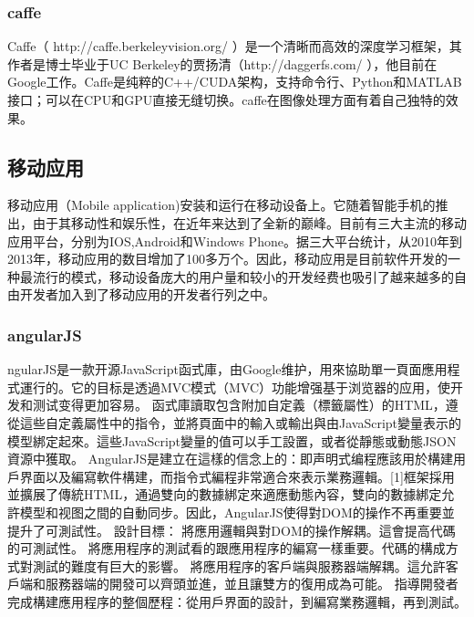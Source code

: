 \subsubsection{caffe}
Caffe（ http://caffe.berkeleyvision.org/ ）是一个清晰而高效的深度学习框架，其作者是博士毕业于UC Berkeley的贾扬清（http://daggerfs.com/ ），他目前在Google工作。Caffe是纯粹的C++/CUDA架构，支持命令行、Python和MATLAB接口；可以在CPU和GPU直接无缝切换。caffe在图像处理方面有着自己独特的效果。

\subsection{移动应用}
移动应用（Mobile application)安装和运行在移动设备上。它随着智能手机的推出，由于其移动性和娱乐性，在近年来达到了全新的巅峰。目前有三大主流的移动应用平台，分别为IOS,Android和Windows Phone。据三大平台统计，从2010年到2013年，移动应用的数目增加了100多万个。因此，移动应用是目前软件开发的一种最流行的模式，移动设备庞大的用户量和较小的开发经费也吸引了越来越多的自由开发者加入到了移动应用的开发者行列之中。
\subsubsection{angularJS}
ngularJS是一款开源JavaScript函式庫，由Google维护，用來協助單一頁面應用程式運行的。它的目标是透過MVC模式（MVC）功能增强基于浏览器的应用，使开发和测试变得更加容易。
函式庫讀取包含附加自定義（標籤屬性）的HTML，遵從這些自定義屬性中的指令，並將頁面中的輸入或輸出與由JavaScript變量表示的模型綁定起來。這些JavaScript變量的值可以手工設置，或者從靜態或動態JSON資源中獲取。
AngularJS是建立在這樣的信念上的：即声明式编程應該用於構建用戶界面以及編寫軟件構建，而指令式編程非常適合來表示業務邏輯。[1]框架採用並擴展了傳統HTML，通過雙向的數據綁定來適應動態內容，雙向的數據綁定允許模型和视图之間的自動同步。因此，AngularJS使得對DOM的操作不再重要並提升了可測試性。
設計目標：
將應用邏輯與對DOM的操作解耦。這會提高代碼的可測試性。
將應用程序的測試看的跟應用程序的編寫一樣重要。代碼的構成方式對測試的難度有巨大的影響。
將應用程序的客戶端與服務器端解耦。這允許客戶端和服務器端的開發可以齊頭並進，並且讓雙方的復用成為可能。
指導開發者完成構建應用程序的整個歷程：從用戶界面的設計，到編寫業務邏輯，再到測試。
